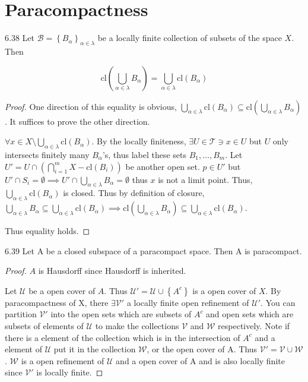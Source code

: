 \documentclass{article}
\newcommand*{\T}{\mathcal{T}}
\newcommand*{\B}{\mathcal{B}}
\newcommand*{\cl}{\mathrm{cl}}
\newcommand*{\subeq}{\subseteq}
\newcommand*{\empset}{\emptyset}
\begin{document}
\pagebreak

\section*{Paracompactness}

\begin{claim}{6.38}\label{Claim 6.38.}
    Let $\B = \left\{ B_\alpha \right\}_{\alpha \in \lambda}$ be a locally finite collection of subsets of the space $X$. Then
    
    \begin{equation*}
        \cl\left(\bigcup_{\alpha \in \lambda} B_{\alpha}\right) = \bigcup_{\alpha \in \lambda} \cl\left(B_{\alpha}\right)
    \end{equation*}
\end{claim}
\begin{proof}
    One direction of this equality is obvious, $\bigcup_{\alpha \in \lambda} \cl\left(B_{\alpha}\right) \subseteq \cl\left(\bigcup_{\alpha \in \lambda} B_{\alpha}\right)$. It suffices to prove the other direction. 
    
    $\forall x \in X \setminus \bigcup_{\alpha \in \lambda} \cl(B_\alpha)$. By the locally finiteness, $\exists U \in \T \ni x \in U$ but $U$ only intersects finitely many $B_\alpha$'s, thus label these sets $B_1, \dots, B_m$. Let $U' = U \cap \left(\bigcap_{i = 1}^m X - \cl(B_i)\right)$ be another open set. $p \in U'$ but $U' \cap S_i = \empset \implies U' \cap \bigcup_{\alpha \in \lambda} B_\alpha = \empset$ thus $x$ is not a limit point. Thus, $\bigcup_{\alpha \in \lambda} \cl(B_\alpha)$ is closed. Thus by definition of closure, $\bigcup_{\alpha \in \lambda} B_{\alpha} \subeq  \bigcup_{\alpha \in \lambda} \cl(B_\alpha) \implies \cl\left(\bigcup_{\alpha \in \lambda} B_{\alpha}\right) \subeq \bigcup_{\alpha \in \lambda} \cl(B_\alpha) $. 
    
    Thus equality holds. 
\end{proof}

\bigskip

\begin{claim}{6.39}\label{Claim 6.39.}
    Let A be a closed subspace of a paracompact space. Then A is paracompact.
\end{claim}
\begin{proof}
    $A$ is Hausdorff since Hausdorff is inherited. 
    
    Let $\mathcal{U}$ be a open cover of $A$. Thus $\mathcal{U'} = \mathcal{U} \cup \left\{ A^c \right\}$ is a open cover of $X$. By paracompactness of X, there $\exists \mathcal{V'}$ a locally finite open refinement of $\mathcal{U'}$. You can partition $\mathcal{V'}$ into the open sets which are subsets of $A^c$ and open sets which are subsets of elements of $\mathcal{U}$ to make the collections $\mathcal{V}$ and $\mathcal{W}$ respectively. Note if there is a element of the collection which is in the intersection of $A^c$ and a element of $\mathcal{U}$ put it in the collection $\mathcal{W}$, or the open cover of A. Thus $\mathcal{V}' = \mathcal{V} \cup \mathcal{W}$. $\mathcal{W}$ is a open refinement of $\mathcal{U}$ and a open cover of A and is also locally finite since $\mathcal{V'}$ is locally finite. 
\end{proof}
\end{document}
